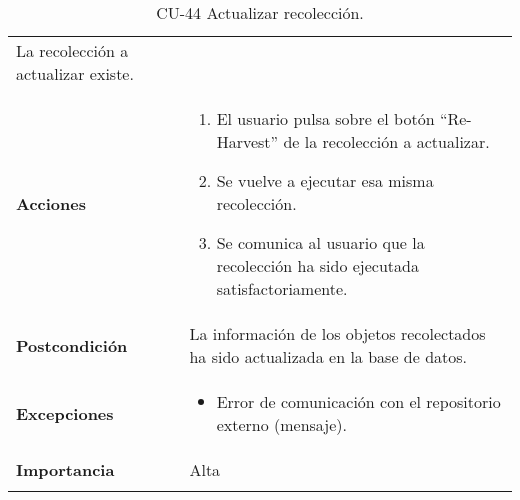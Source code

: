 \begin{longtable}[]{@{}ll@{}}
\begin{minipage}[t]{0.72\columnwidth}
La recolección a actualizar existe.\strut
\end{minipage}\tabularnewline
\begin{minipage}[t]{0.22\columnwidth}\raggedright
\textbf{Acciones}\strut
\end{minipage} & \begin{minipage}[t]{0.72\columnwidth}\raggedright
\begin{enumerate}
\def\labelenumi{\arabic{enumi}.}
\tightlist
\item
  El usuario pulsa sobre el botón ``Re-Harvest'' de la recolección a
  actualizar.
\item
  Se vuelve a ejecutar esa misma recolección.
\item
  Se comunica al usuario que la recolección ha sido ejecutada
  satisfactoriamente.
\end{enumerate}\strut
\end{minipage}\tabularnewline
\begin{minipage}[t]{0.22\columnwidth}\raggedright
\textbf{Postcondición}\strut
\end{minipage} & \begin{minipage}[t]{0.72\columnwidth}\raggedright
La información de los objetos recolectados ha sido actualizada en la
base de datos.\strut
\end{minipage}\tabularnewline
\begin{minipage}[t]{0.22\columnwidth}\raggedright
\textbf{Excepciones}\strut
\end{minipage} & \begin{minipage}[t]{0.72\columnwidth}\raggedright
\begin{itemize}
\tightlist
\item
  Error de comunicación con el repositorio externo (mensaje).
\end{itemize}\strut
\end{minipage}\tabularnewline
\begin{minipage}[t]{0.22\columnwidth}\raggedright
\textbf{Importancia}\strut
\end{minipage} & \begin{minipage}[t]{0.72\columnwidth}\raggedright
Alta\strut
\end{minipage}\tabularnewline
\bottomrule
\caption{CU-44 Actualizar recolección.}
\end{longtable}

